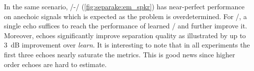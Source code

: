 \mynewline
In the same scenario, \EM/-\NMF/ (\cref{fig:separake:em_spkr}) has near-perfect performance on anechoic signals which is expected as the problem is overdetermined.
For \MU/, a single echo suffices to reach the performance of learned \RTFs/ and further improve it.
Moreover, echoes significantly improve separation quality as illustrated by up to 3~dB improvement over \textit{learn}.
It is interesting to note that in all experiments the first three echoes nearly saturate the metrics.
This is good news since higher order echoes are hard to estimate.

